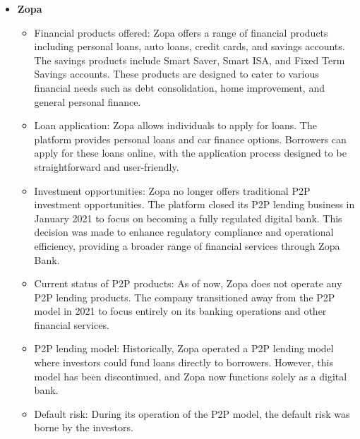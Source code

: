 \documentclass{article}
\begin{document}
\begin{itemize}
    \item \textbf{Zopa}
        \begin{itemize}
            \item Financial products offered: Zopa offers a range of financial products including personal loans, auto loans, credit cards, and savings accounts. The savings products include Smart Saver, Smart ISA, and Fixed Term Savings accounts. These products are designed to cater to various financial needs such as debt consolidation, home improvement, and general personal finance.
            \item Loan application: Zopa allows individuals to apply for loans. The platform provides personal loans and car finance options. Borrowers can apply for these loans online, with the application process designed to be straightforward and user-friendly.
            \item Investment opportunities: Zopa no longer offers traditional P2P investment opportunities. The platform closed its P2P lending business in January 2021 to focus on becoming a fully regulated digital bank. This decision was made to enhance regulatory compliance and operational efficiency, providing a broader range of financial services through Zopa Bank.
            \item Current status of P2P products: As of now, Zopa does not operate any P2P lending products. The company transitioned away from the P2P model in 2021 to focus entirely on its banking operations and other financial services.
            \item P2P lending model: Historically, Zopa operated a P2P lending model where investors could fund loans directly to borrowers. However, this model has been discontinued, and Zopa now functions solely as a digital bank.
            \item Default risk: During its operation of the P2P model, the default risk was borne by the investors.
        \end{itemize}  


\end{itemize}
\end{document}
